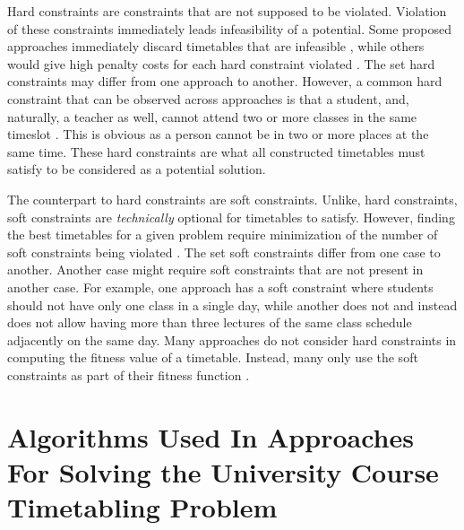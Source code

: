 Hard constraints are constraints that are not supposed to be violated. Violation of these constraints immediately leads infeasibility of a potential. Some proposed approaches immediately discard timetables that are infeasible \cite{nlgd-landa-silva}\cite{nlgdrl-obit}, while others would give high penalty costs for each hard constraint violated \cite{supachate-noval-approach-ga-thai}. The set hard constraints may differ from one approach to another. However, a common hard constraint that can be observed across approaches is that a student, and, naturally, a teacher as well, cannot attend two or more classes in the same timeslot \cite{nlgd-landa-silva}\cite{bedoya-non-standard-ga}. This is obvious as a person cannot be in two or more places at the same time. These hard constraints are what all constructed timetables must satisfy to be considered as a potential solution.

The counterpart to hard constraints are soft constraints. Unlike, hard constraints, soft constraints are \textit{technically} optional for timetables to satisfy. However, finding the best timetables for a given problem require minimization of the number of soft constraints being violated \cite{nlgd-landa-silva}. The set soft constraints differ from one case to another. Another case might require soft constraints that are not present in another case. For example, one approach \cite{nlgdrl-obit} has a soft constraint where students should not have only one class in a single day, while another \cite{supachate-noval-approach-ga-thai} does not and instead does not allow having more than three lectures of the same class schedule adjacently on the same day.	Many approaches do not consider hard constraints in computing the fitness value of a timetable. Instead, many only use the soft constraints as part of their fitness function \cite{sanjay-an-application-of-ga}\cite{nlgdrl-obit}\cite{bedoya-non-standard-ga}.

\section{Algorithms Used In Approaches For Solving the University Course Timetabling Problem}
